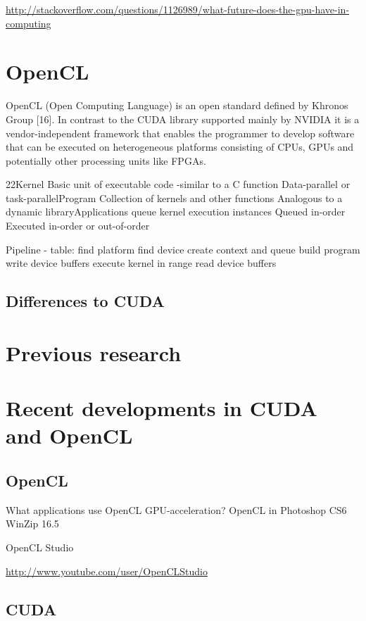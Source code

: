 \hyperref[AMD]{http://stackoverflow.com/questions/1126989/what-future-does-the-gpu-have-in-computing}


\section{OpenCL}

OpenCL (Open Computing Language) is an open
standard defined by Khronos Group [16]. In contrast
to the CUDA library supported mainly by NVIDIA
it is a vendor-independent framework that enables
the programmer to develop software that can be executed
on heterogeneous platforms consisting of CPUs,
GPUs and potentially other processing units like FPGAs.

22Kernel
Basic unit of executable code -similar to a C function
Data-parallel or task-parallelProgram
Collection of kernels and other functions
Analogous to a dynamic libraryApplications queue kernel execution instances
Queued in-order
Executed in-order or out-of-order

Pipeline - table:
find platform
find device
create context and queue
build program
write device buffers
execute kernel in range
read device buffers


\subsection{Differences to CUDA}

\section{Previous research}



\section{Recent developments in CUDA and OpenCL}
\subsection{OpenCL}

What applications use OpenCL GPU-acceleration?
OpenCL in Photoshop CS6
WinZip 16.5

OpenCL Studio

\hyperref[OpenCLStudio]{http://www.youtube.com/user/OpenCLStudio}

\subsection{CUDA}


